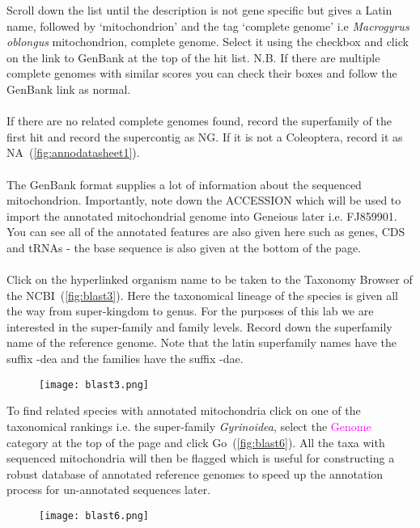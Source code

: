 \documentclass[11pt]{article}
\begin{document}
Scroll down the list until the description is not gene specific but gives a Latin name, followed by `mitochondrion' and the tag `complete genome' i.e \textit{Macrogyrus oblongus} mitochondrion, complete genome. Select it using the checkbox and click on the link to GenBank at the top of the hit list. N.B. If there are multiple complete genomes with similar scores you can check their boxes and follow the GenBank link as normal. 
\\
\\
If there are no related complete genomes found, record the superfamily of the first hit and record the supercontig as NG. If it is not a Coleoptera, record it as NA~(\autoref{fig:annodatasheet1}).
\\
\\
The GenBank format supplies a lot of information about the sequenced mitochondrion. Importantly, note down the ACCESSION which will be used to import the annotated mitochondrial genome into Geneious later i.e. FJ859901. You can see all of the annotated features are also given here such as genes, CDS and tRNAs  - the base sequence is also given at the bottom of the page. 
\\
\\
Click on the hyperlinked organism name to be taken to the Taxonomy Browser of the NCBI~(\autoref{fig:blast3}). Here the taxonomical lineage of the species is given all the way from super-kingdom to genus. For the purposes of this lab we are interested in the super-family and family levels. Record down the superfamily name of the reference genome. Note that the latin superfamily names have the suffix -dea and the families have the suffix -dae.

\begin{figure}[H]
  \centering
    \texttt{[image: blast3.png]}
  \label{fig:blast3}
\end{figure}

To find related species with annotated mitochondria click on one of the taxonomical rankings i.e. the super-family \textit{Gyrinoidea}, select the \textcolor{magenta}{Genome} category at the top of the page and click Go~(\autoref{fig:blast6}). All the taxa with sequenced mitochondria will then be flagged which is useful for constructing a robust database of annotated reference genomes to speed up the annotation process for un-annotated sequences later.

\begin{figure}[H]
  \centering
    \texttt{[image: blast6.png]}
  \label{fig:blast6}
\end{figure}
\end{document}
